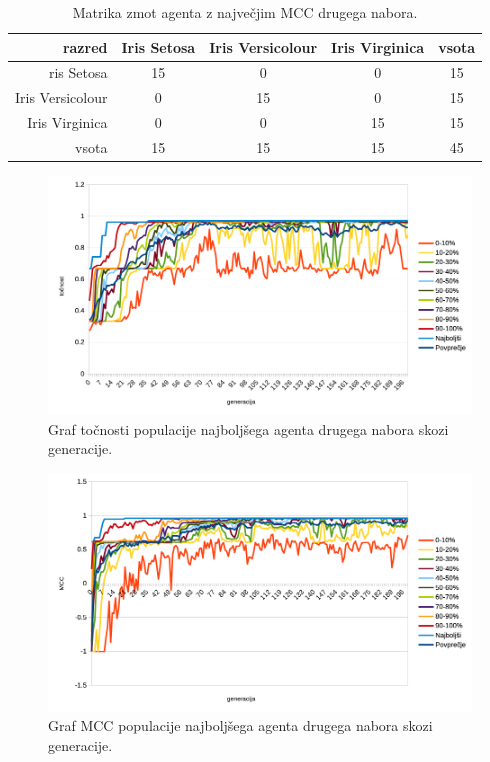 \begin{table}[H]
    \centering
    \begin{tabular}{||rcccc||}
        \hline
        razred           & Iris Setosa & Iris Versicolour & Iris Virginica & vsota \\ \hline
        ris Setosa       & 15          & 0                & 0              & 15    \\ \hline
        Iris Versicolour & 0           & 15               & 0              & 15    \\ \hline
        Iris Virginica   & 0           & 0                & 15             & 15    \\ \hline
        vsota            & 15          & 15               & 15             & 45    \\ \hline
    \end{tabular}
    \caption{Matrika zmot agenta z največjim MCC drugega nabora.}
    \label{tab:iris_mcc_2}
\end{table}

\begin{figure}[H]
    \begin{center}
        \includegraphics[width=13cm]{iris/2/acc}
    \end{center}
    \caption{Graf točnosti populacije najboljšega agenta drugega nabora skozi generacije.}
    \label{fig:iris_acc_2}
\end{figure}

\begin{figure}[H]
    \begin{center}
        \includegraphics[width=13cm]{iris/2/mcc}
    \end{center}
    \caption{Graf MCC populacije najboljšega agenta drugega nabora skozi generacije.}
    \label{fig:iris_mcc_2}
\end{figure}

